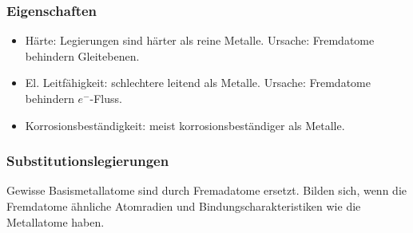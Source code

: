 \subsubsection{Eigenschaften}
\begin{itemize}
	\item Härte: Legierungen sind härter als reine Metalle. Ursache: Fremdatome behindern Gleitebenen.
	\item El. Leitfähigkeit: schlechtere leitend als Metalle. Ursache: Fremdatome behindern $e^-$-Fluss.
	\item Korrosionsbeständigkeit: meist korrosionsbeständiger als Metalle.
\end{itemize}

\subsubsection{Substitutionslegierungen}
Gewisse Basismetallatome sind durch Fremadatome ersetzt. Bilden sich, wenn die Fremdatome ähnliche Atomradien und Bindungscharakteristiken wie die Metallatome haben.


